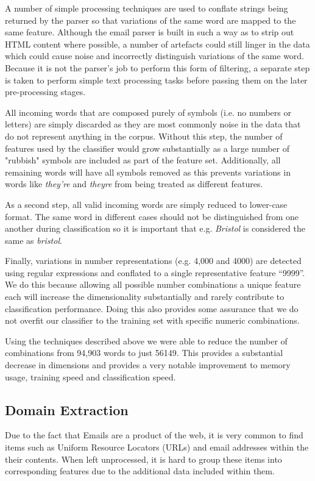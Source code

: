 A number of simple processing techniques are used to conflate strings being returned by the parser so that variations of the same word are mapped to the same feature. Although the email parser is built in such a way as to strip out HTML content where possible, a number of artefacts could still linger in the data which could cause noise and incorrectly distinguish variations of the same word. Because it is not the parser's job to perform this form of filtering, a separate step is taken to perform simple text processing tasks before passing them on the later pre-processing stages.

All incoming words that are composed purely of symbols (i.e. no numbers or letters) are simply discarded as they are most commonly noise in the data that do not represent anything in the corpus. Without this step, the number of features used by the classifier would grow substantially as a large number of "rubbish" symbols are included as part of the feature set. Additionally, all remaining words will have all symbols removed as this prevents variations in words like \emph{they're} and \emph{theyre} from being treated as different features.

As a second step, all valid incoming words are simply reduced to lower-case format. The same word in different cases should not be distinguished from one another during classification so it is important that e.g. \emph{Bristol} is considered the same as \emph{bristol}.

Finally, variations in number representations (e.g. 4,000 and 4000) are detected using regular expressions and conflated to a single representative feature ``9999''. We do this because allowing all possible number combinations a unique feature each will increase the dimensionality substantially and rarely contribute to classification performance. Doing this also provides some assurance that we do not overfit our classifier to the training set with specific numeric combinations.

Using the techniques described above we were able to reduce the number of  combinations from 94,903 words to just 56149. This provides a substantial decrease in dimensions and provides a very notable improvement to memory usage, training speed and classification speed. 

\subsection{Domain Extraction}

Due to the fact that Emails are a product of the web, it is very common to find items such as Uniform Resource Locators (URLs) and email addresses within the their contents. When left unprocessed, it is hard to group these items into corresponding features due to the additional data included within them.

